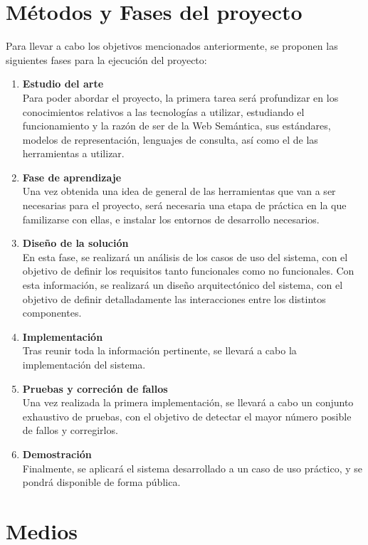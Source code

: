 \documentclass[a4paper,11pt]{report}
\begin{document}
\chapter*{Métodos y Fases del proyecto}

Para llevar a cabo los objetivos mencionados anteriormente, se proponen las siguientes fases para la ejecución del proyecto:
\begin{enumerate}
  \item \textbf{Estudio del arte } ~\\
  Para poder abordar el proyecto, la primera tarea será profundizar en los conocimientos relativos a las tecnologías a utilizar, estudiando el funcionamiento y la razón de ser de la Web Semántica, sus estándares, modelos de representación, lenguajes de consulta, así como el de las herramientas a utilizar.
  \item \textbf{Fase de aprendizaje} ~\\
  Una vez obtenida una idea de general de las herramientas que van a ser necesarias para el proyecto, será necesaria una etapa de práctica en la que familizarse con ellas, e instalar los entornos de desarrollo necesarios.
  \item \textbf{Diseño de la solución} ~\\ 
  En esta fase, se realizará un análisis de los casos de uso del sistema, con el objetivo de definir los requisitos tanto funcionales como no funcionales. Con esta información, se realizará un diseño arquitectónico del sistema, con el objetivo de definir detalladamente las interacciones entre los distintos componentes.
  \item \textbf{Implementación} ~\\
  Tras reunir toda la información pertinente, se llevará a cabo la implementación del sistema.
  \item \textbf{Pruebas y correción de fallos} ~\\
  Una vez realizada la primera implementación, se llevará a cabo un conjunto exhaustivo de pruebas, con el objetivo de detectar el mayor número posible de fallos y corregirlos.
  \item \textbf{Demostración } ~\\
  Finalmente, se aplicará el sistema desarrollado a un caso de uso práctico, y se pondrá disponible de forma pública.
\end{enumerate}

\chapter*{Medios}
\end{document}

